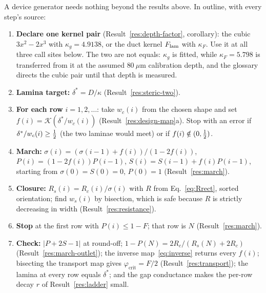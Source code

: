 A device generator needs nothing beyond the results above. In outline, with every step's source:
\begin{enumerate}
\item \textbf{Declare one kernel pair} (Result~\ref{res:depth-factor}, corollary): the cubic
$3x^2-2x^3$ with $\kappa_g=4.9138$, or the duct kernel $F_{\mathrm{lam}}$ with $\kappa_F$. Use it at all
three call sites below. The two are not equals: $\kappa_g$ is fitted, while $\kappa_F=5.798$ is
transferred from it at the assumed $80~\mu$m calibration depth, and the glossary directs the cubic
pair until that depth is measured.
\item \textbf{Lamina target:} $\delta^*=D/\kappa$ (Result~\ref{res:steric-two}).
\item \textbf{For each row} $i=1,2,\dots$: take $w_c(i)$ from the chosen shape and set
$f(i)=\mathcal K(\delta^*/w_c(i))$ (Result~\ref{res:design-map}a). Stop with an error if
$\delta^*/w_c(i)\ge\tfrac{1}{2}$ (the two laminae would meet) or if $f(i)\notin(0,\tfrac{1}{2})$.
\item \textbf{March:} $\sigma(i)=(\sigma(i-1)+f(i))/(1-2f(i))$, $P(i)=(1-2f(i))P(i-1)$,
$S(i)=S(i-1)+f(i)P(i-1)$, starting from $\sigma(0)=S(0)=0$, $P(0)=1$ (Result~\ref{res:march}).
\item \textbf{Closure:} $R_s(i)=R_c(i)/\sigma(i)$ with $R$ from Eq.~\eqref{eq:Rrect}, sorted
orientation; find $w_s(i)$ by bisection, which is safe because $R$ is strictly decreasing in
width (Result~\ref{res:resistance}).
\item \textbf{Stop} at the first row with $P(i)\le1-F$; that row is $N$ (Result~\ref{res:march}).
\item \textbf{Check:} $|P+2S-1|$ at round-off; $1-P(N)=2R_c/(R_s(N)+2R_c)$
(Result~\ref{res:march-outlet}); the inverse map~\eqref{eq:inverse} returns every $f(i)$;
bisecting the transport map gives $\varphi_{\mathrm{crit}}=F/2$ (Result~\ref{res:transport});
the lamina at every row equals $\delta^*$; and the gap conductance makes the per-row decay $r$ of
Result~\ref{res:ladder} small.
\end{enumerate}

